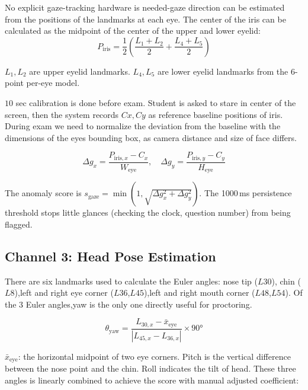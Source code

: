 \documentclass[runningheads]{llncs}
\begin{document}
No explicit gaze-tracking hardware is needed-gaze direction can be estimated from the positions of the landmarks at each eye. The center of the iris can be calculated as the midpoint of the center of the upper and lower eyelid:
\begin{equation}
    P_{\text{iris}} = \frac{1}{2}\left(\frac{L_1 + L_2}{2} + \frac{L_4 + L_5}{2}\right)
\end{equation}

$L_1, L_2$ are upper eyelid landmarks. $L_4, L_5$ are lower eyelid landmarks from the 6-point per-eye model.

$10$ sec calibration is done before exam. Student is asked to stare in center of the screen, then the system records $Cx, Cy$ as reference baseline positions of iris. During exam we need to normalize the deviation from the baseline with the dimensions of the eyes bounding box, as camera distance and size of face differs.

\begin{equation}
    \Delta g_x = \frac{P_{\text{iris},x} - C_x}{W_{\text{eye}}}, \quad \Delta g_y = \frac{P_{\text{iris},y} - C_y}{H_{\text{eye}}}
\end{equation}

The anomaly score is $s_{\text{gaze}} = \min(1, \sqrt{\Delta g_x^2 + \Delta g_y^2})$. The 1000\,ms persistence threshold stops little glances (checking the clock, question number) from being flagged.

\subsection{Channel 3: Head Pose Estimation}

There are six landmarks used to calculate the Euler angles: nose tip ($L{30}$), chin ($L8$),left and right eye corner ($L{36}$,$L{45}$),left and right mouth corner ($L{48}$,$L{54}$). Of the 3 Euler angles,yaw is the only one directly useful for proctoring.

\begin{equation}
    \theta_{\text{yaw}} = \frac{L_{30,x} - \bar{x}_{\text{eye}}}{|L_{45,x} - L_{36,x}|} \times 90°
\end{equation}

$\bar{x}_{\text{eye}}$: the horizontal midpoint of two eye corners. Pitch is the vertical difference between the nose point and the chin. Roll indicates the tilt of head. These three angles is linearly combined to achieve the score with manual adjusted coefficient:
\end{document}
